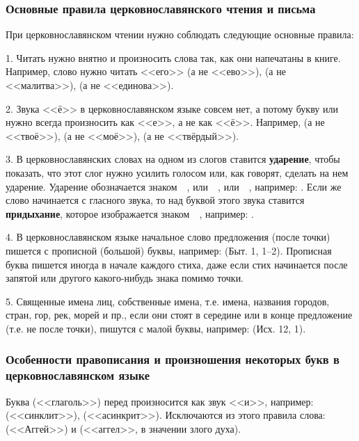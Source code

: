 \documentclass[11pt,a4paper,oneside]{memoir}
\begin{document}
\subsubsection{Основные правила церковнославянского чтения и письма}

При церковнославянском чтении нужно соблюдать следующие основные правила:

1. Читать нужно внятно и произносить слова так, как они напечатаны в книге. Например, слово {} нужно читать <<его>> (а не <<ево>>), {} (а не <<малитва>>), {} (а не <<единова>>).

2. Звука <<ё>> в церковнославянском языке совсем нет, а потому букву {} или {} нужно всегда произносить как <<е>>, а не как <<ё>>. Например, {} (а не <<твоё>>), {} (а не <<моё>>), {} (а не <<твёрдый>>).

3. В церковнославянских словах на одном из слогов ставится \textbf{ударение}, чтобы показать, что этот слог нужно усилить голосом или, как говорят, сделать на нем ударение. Ударение обозначается знаком~~{}, или~~{}, или~~{}, например: {}. Если же слово начинается с гласного звука, то над буквой этого звука ставится \textbf{придыхание}, которое изображается знаком~~{}, например: {}.

4. В церковнославянском языке начальное слово предложения (после точки) пишется с прописной (большой) буквы, например: {} (Быт. 1, 1--2). Прописная буква пишется иногда в начале каждого стиха, даже если стих начинается после запятой или другого какого-нибудь знака помимо точки.

5. Священные имена лиц, собственные имена, т.е. имена, названия городов, стран, гор, рек, морей и пр., если они стоят в середине или в конце предложение (т.е. не после точки), пишутся с малой буквы, например: {} (Исх. 12, 1).


\subsubsection{Особенности правописания и произношения некоторых букв в церковнославянском языке}

Буква {} (<<глаголь>>) перед {} произносится как звук <<и>>, например: {} (<<синклит>>), {} (<<асинкрит>>). Исключаются из этого правила слова: {} (<<Аггей>>) и {} (<<аггел>>, в значении злого духа).
\end{document}
